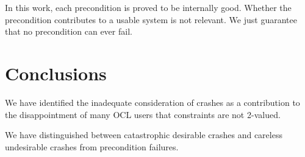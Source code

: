 \documentclass{llncs}
\begin{document}
In this work, each precondition is proved to be internally good. Whether the precondition contributes to a usable system is not relevant. We just guarantee that no precondition can ever fail.








\section{Conclusions}\label{Conclusions}

We have identified the inadequate consideration of crashes as a contribution to the disappointment of many OCL users that constraints are not 2-valued.

We have distinguished between catastrophic desirable crashes and careless undesirable crashes from precondition failures.
\end{document}

